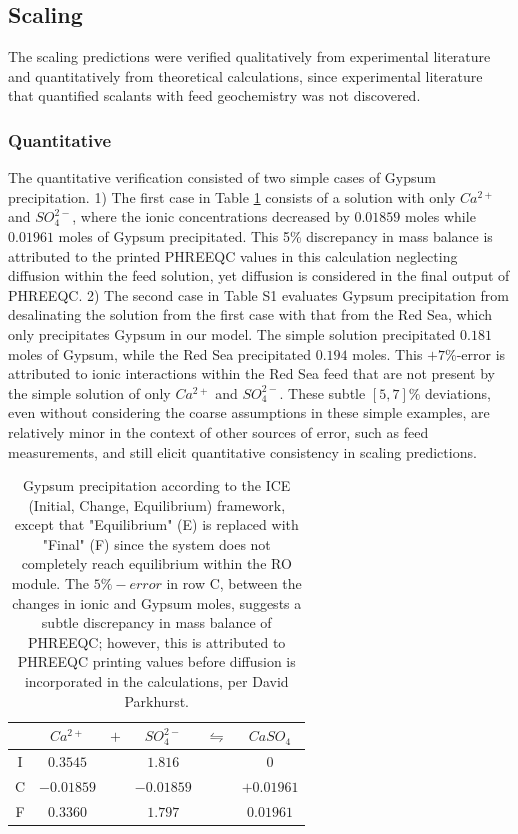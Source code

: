 \subsection{Scaling}
The scaling predictions were verified qualitatively from experimental literature and quantitatively from theoretical calculations, since experimental literature that quantified scalants with feed geochemistry was not discovered.

\subsubsection{Quantitative}
The quantitative verification consisted of two simple cases of Gypsum precipitation. 1) The first case in Table \ref{gypsum_ice_table} consists of a solution with only $Ca^{2+}$ and $SO_4^{2-}$, where the ionic concentrations decreased by $0.01859$ moles while $0.01961$ moles of Gypsum precipitated. This 5\% discrepancy in mass balance is attributed to the printed PHREEQC values in this calculation neglecting diffusion within the feed solution, yet diffusion is considered in the final output of PHREEQC. 2) The second case in Table S1 evaluates Gypsum precipitation from desalinating the solution from the first case with that from the Red Sea, which only precipitates Gypsum in our model. The simple solution precipitated $0.181$ moles of Gypsum, while the Red Sea precipitated $0.194$ moles. This $+7\%$-error is attributed to ionic interactions within the Red Sea feed that are not present by the simple solution of only $Ca^{2+}$ and $SO_4^{2-}$. These subtle $[5,7]\%$ deviations, even without considering the coarse assumptions in these simple examples, are relatively minor in the context of other sources of error, such as feed measurements, and still elicit quantitative consistency in scaling predictions.

\begin{table}
    \centering
    \begin{tabular}{c|ccccc}
      \toprule
       & $Ca^{2+}$ & $+$ & $SO_4^{2-}$ & $\leftrightharpoons$ & $CaSO_4$ \\
      \midrule
      I & $0.3545$ && $1.816$ && $0$ \\
      C & $-0.01859$ && $-0.01859$ && $+0.01961$ \\
      F & $0.3360$ && $1.797$ && $0.01961$ \\
      \bottomrule
    \end{tabular}
    \caption{
        Gypsum precipitation according to the ICE (Initial, Change, Equilibrium) framework, except that "Equilibrium" (E) is replaced with "Final" (F) since the system does not completely reach equilibrium within the RO module. The $5\%-error$ in row C, between the changes in ionic and Gypsum moles, suggests a subtle discrepancy in mass balance of PHREEQC; however, this is attributed to PHREEQC printing values before diffusion is incorporated in the calculations, per David Parkhurst. 
      }
    \label{gypsum_ice_table}
\end{table}

